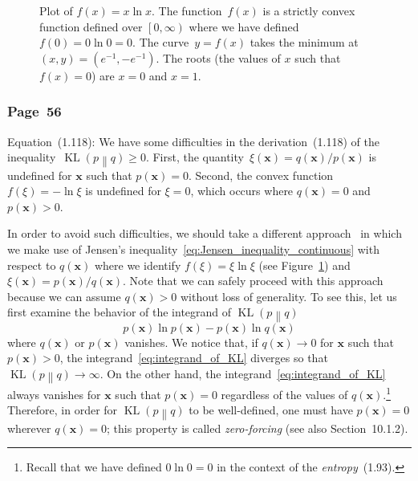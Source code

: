 \documentclass[12pt,a4paper]{article}
\newcommand{\erratum}[1]{%
\subsubsection*{#1}
\addcontentsline{toc}{subsection}{#1}}
\begin{document}
\begin{figure}
\centering

\caption{Plot of $f(x) = x \ln x$.
The function~$f(x)$ is a strictly convex function defined over $\left[0, \infty\right)$
where we have defined $f(0) = 0 \ln 0 = 0$.
The curve~$y = f(x)$ takes the minimum at $(x, y) = \left(e^{-1}, -e^{-1}\right)$.
The roots (the values of $x$ such that $f(x) = 0$) are $x = 0$ and $x = 1$.}
\label{fig:x_ln_x}
\end{figure}

\erratum{Page~56}
Equation~(1.118):
We have some difficulties in the derivation~(1.118) of
the inequality~$\operatorname{KL}\left( p \middle\| q \right) \geqslant 0$.
First, the quantity~$\xi(\mathbf{x}) = q(\mathbf{x})/p(\mathbf{x})$ is undefined for $\mathbf{x}$
such that $p(\mathbf{x}) = 0$.
Second, the convex function~$f(\xi) = -\ln\xi$ is undefined for $\xi = 0$,
which occurs where $q(\mathbf{x}) = 0$ and $p(\mathbf{x}) > 0$.

In order to avoid such difficulties,
we should take a different approach~\citep{MacKay:Information}
in which we make use of Jensen's inequality~\eqref{eq:Jensen_inequality_continuous}
with respect to $q(\mathbf{x})$ where
we identify $f(\xi) = \xi\ln\xi$ (see Figure~\ref{fig:x_ln_x}) and
$\xi(\mathbf{x}) = p(\mathbf{x})/q(\mathbf{x})$.
Note that we can safely proceed with this approach
because we can assume $q(\mathbf{x}) > 0$
without loss of generality.
To see this, let us first examine the behavior of the integrand of
$\operatorname{KL}\left( p \middle\| q \right)$
\begin{equation}
p(\mathbf{x}) \ln p(\mathbf{x}) - p(\mathbf{x}) \ln q(\mathbf{x})
\label{eq:integrand_of_KL}
\end{equation}
where $q(\mathbf{x})$ or $p(\mathbf{x})$ vanishes.
We notice that, if $q(\mathbf{x}) \to 0$ for $\mathbf{x}$ such that $p(\mathbf{x}) > 0$,
the integrand~\eqref{eq:integrand_of_KL} diverges so that
$\operatorname{KL}\left( p \middle\| q \right) \to \infty$.
On the other hand, the integrand~\eqref{eq:integrand_of_KL} always vanishes for $\mathbf{x}$
such that $p(\mathbf{x}) = 0$ regardless of the values of $q(\mathbf{x})$.\footnote{%
Recall that we have defined $0 \ln 0 = 0$ in the context of the \emph{entropy}~(1.93).}
Therefore, in order for $\operatorname{KL}\left( p \middle\| q \right)$ to be well-defined,
one must have $p(\mathbf{x}) = 0$ wherever $q(\mathbf{x}) = 0$;
this property is called \emph{zero-forcing} (see also Section~10.1.2).
\end{document}

